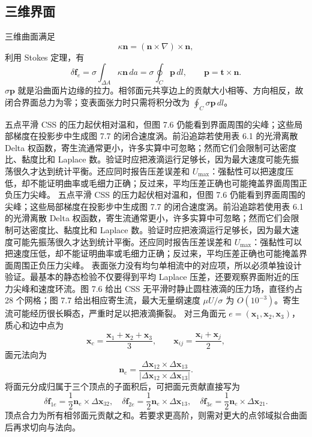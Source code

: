 \documentclass[11pt,a4paper,openany,fontset=none]{ctexbook}
\begin{document}
\subsection{三维界面}

三维曲面满足
\begin{equation}
 \kappa\boldsymbol n=(\boldsymbol n\times\nabla)\times\boldsymbol n,
 \tag{7.51}
\end{equation}
利用 Stokes 定理，有
\begin{equation}
 \delta\boldsymbol f_e
 =\sigma\int_{\Delta A}\kappa\boldsymbol n\,da
 =\sigma\oint_C\boldsymbol p\,dl,
 \qquad \boldsymbol p=\boldsymbol t\times\boldsymbol n.
 \tag{7.52}
\end{equation}
$\sigma\boldsymbol p$ 就是沿曲面片边缘的拉力。相邻面元共享边上的贡献大小相等、方向相反，故闭合界面总力为零；变表面张力时只需将积分改为 $\oint_C\sigma\boldsymbol p\,dl$。

五点平滑 CSS 的压力起伏相对温和，但图 7.6 仍能看到界面周围的尖峰；这些局部梯度在投影步中生成图 7.7 的闭合速度涡。前沿追踪若使用表 6.1 的光滑离散 Delta 权函数，寄生流通常更小，许多实算中可忽略；然而它们会限制可达密度比、黏度比和 Laplace 数。验证时应把液滴运行足够长，因为最大速度可能先振荡很久才达到统计平衡。还应同时报告压差误差和 $U_{\max}$：强黏性可以把速度压低，却不能证明曲率或毛细力正确；反过来，平均压差正确也可能掩盖界面周围正负压力尖峰。
五点平滑 CSS 的压力起伏相对温和，但图 7.6 仍能看到界面周围的尖峰；这些局部梯度在投影步中生成图 7.7 的闭合速度涡。前沿追踪若使用表 6.1 的光滑离散 Delta 权函数，寄生流通常更小，许多实算中可忽略；然而它们会限制可达密度比、黏度比和 Laplace 数。验证时应把液滴运行足够长，因为最大速度可能先振荡很久才达到统计平衡。还应同时报告压差误差和 $U_{\max}$：强黏性可以把速度压低，却不能证明曲率或毛细力正确；反过来，平均压差正确也可能掩盖界面周围正负压力尖峰。
表面张力没有均匀单相流中的对应项，所以必须单独设计验证。最基本的静态检验不仅要得到平均 Laplace 压差，还要观察界面附近的压力尖峰和速度环流。图 7.6 给出 CSS 无平滑时静止圆柱液滴的压力场，直径约占 28 个网格；图 7.7 给出相应寄生流，最大无量纲速度 $\mu U/\sigma$ 为 $O(10^{-3})$。寄生流可能经历很长瞬态，严重时足以把液滴撕裂。
对三角面元 $e=(\boldsymbol x_1,\boldsymbol x_2,\boldsymbol x_3)$，质心和边中点为
\begin{equation}
 \boldsymbol x_c=\frac{\boldsymbol x_1+\boldsymbol x_2+\boldsymbol x_3}{3},
 \qquad
 \boldsymbol x_{ij}=\frac{\boldsymbol x_i+\boldsymbol x_j}{2},
 \tag{7.54--7.55}
\end{equation}
面元法向为
\begin{equation}
 \boldsymbol n_e=\frac{\Delta\boldsymbol x_{12}\times\Delta\boldsymbol x_{13}}
 {|\Delta\boldsymbol x_{12}\times\Delta\boldsymbol x_{13}|}.
 \tag{7.56}
\end{equation}
将面元分成归属于三个顶点的子面积后，可把面元贡献直接写为
\begin{equation}
 \delta\boldsymbol f_{1e}=\frac12\boldsymbol n_e\times\Delta\boldsymbol x_{32},
 \quad
 \delta\boldsymbol f_{2e}=\frac12\boldsymbol n_e\times\Delta\boldsymbol x_{13},
 \quad
 \delta\boldsymbol f_{3e}=\frac12\boldsymbol n_e\times\Delta\boldsymbol x_{21}.
 \tag{7.59}
\end{equation}
顶点合力为所有相邻面元贡献之和。若要求更高阶，则需对更大的点邻域拟合曲面后再求切向与法向。
\end{document}
